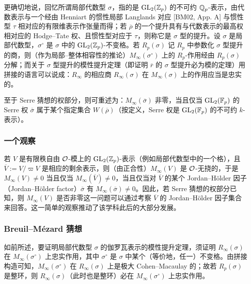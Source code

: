 更确切地说，回忆所谓局部代数型 $\sigma$，指的是 $\mathrm{GL}_2(\mathbb{Z}_p)$ 的不可约 $\mathbb{Q}_p$-表示，由代数表示与一个经由 Henniart 的惯性局部 Langlands 对应 [BM02, App. A] 与惯性型 $\tau$ 相对应的有限维表示作张量而得；若 $\overline{\rho}$ 的一个提升具有与代数表示的最高权相对应的 Hodge--Tate 权、且惯性型对应于 $\tau$，则称它是 $\sigma$ 型的提升。设 $\sigma$ 是局部代数型，$\sigma^\circ$ 是 $\sigma$ 中的 $\mathrm{GL}_2(\mathbb{Z}_p)$-不变格。若 $R_p(\sigma)$ 记 $R_p$ 中参数化 $\sigma$ 型提升的商，则（作为局部--整体相容性的推论）$M_\infty(\sigma^\circ)$ 上的 $R_p$-作用经由 $R_p(\sigma)$ 分解；而关于 $\sigma$ 型提升的模性提升定理（即证明 $\overline{r}$ 的 $\sigma$ 型提升必为模的定理）用拼接的语言可以说成：$R_\infty$ 的相应商 $R_\infty(\sigma)$ 在 $M_\infty(\sigma)$ 上的作用应当是忠实的。

至于 Serre 猜想的权部分，则可重述为：$M_\infty(\overline{\sigma})$ 非零，当且仅当 $\mathrm{GL}_2(\mathbb{F}_p)$ 的 Serre 权 $\overline{\sigma}$ 属于某个指定集合 $W(\overline{\rho})$（按定义，Serre 权是 $\mathrm{GL}_2(\mathbb{F}_p)$ 的不可约 $k$-表示）。

\subsubsection{一个观察}

若 $V$ 是有限秩自由 $\mathcal{O}$-模上的 $\mathrm{GL}_2(\mathbb{Z}_p)$-表示（例如局部代数型中的一个格），且 $\overline{V}:=V/\varpi V$ 是相应的剩余表示，则（由正合性）$M_\infty(V)$ 是 $\mathcal{O}$-无挠的，于是 $M_\infty(V)\neq0$ 当且仅当 $M_\infty(\overline{V})\neq0$，当且仅当对 $\overline{V}$ 的某个 Jordan--Hölder 因子（Jordan--Hölder factor）$\overline{\sigma}$ 有 $M_\infty(\overline{\sigma})\neq0$。因此，若 Serre 猜想的权部分已知，则 $M_\infty(V)$ 是否非零这一问题可以通过考察 $\overline{V}$ 的 Jordan--Hölder 因子集合来回答。这一简单的观察推动了该学科此后的大部分发展。

\subsubsection{Breuil--Mézard 猜想}

如前所述，要证明局部代数型 $\sigma$ 的伽罗瓦表示的模性提升定理，须证明 $R_\infty(\sigma)$ 在 $M_\infty(\sigma^\circ)$ 上忠实作用，其中 $\sigma^\circ$ 是 $\sigma$ 中某个（等价地，任一）不变格。由拼接构造可知，$M_\infty(\sigma^\circ)$ 在 $R_\infty(\sigma)$ 上是极大 Cohen--Macaulay 的；故若 $R_p(\sigma)$ 是整环，则 $R_\infty(\sigma)$（此时也是整环）必在 $M_\infty(\sigma^\circ)$ 上忠实作用。

